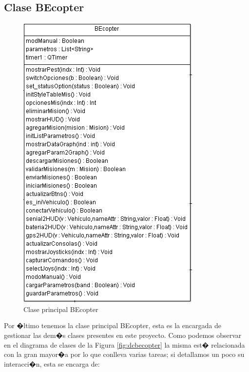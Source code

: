 \subsection{Clase BEcopter}

\begin{figure}[h!]
	\centering
	\includegraphics[width=0.5\linewidth, height=0.3\textheight]{Imagenes/classBEcopter}
	\caption{Clase principal BEcopter}
	\label{fig:classbecopter}
\end{figure}

Por �ltimo tenemos la clase principal BEcopter, esta es la encargada de gestionar las dem�s clases presentes en este proyecto. Como podemos observar en el diagrama de clases de la Figura \ref{fig:dcbecopter} la misma est� relacionada con la gran mayor�a por lo que conlleva varias tareas; si detallamos un poco su interacci�n, esta se encarga de:

